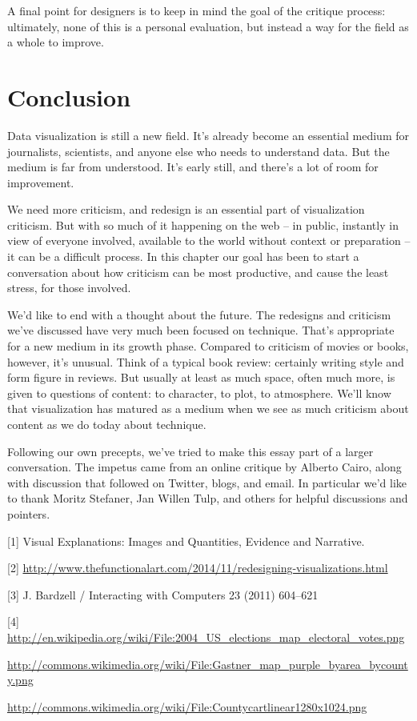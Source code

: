 \documentclass[sigconf,nonacm,screen,pbalance]{acmart}
\begin{document}
A final point for designers is to keep in mind the goal of
the critique process: ultimately, none of this is a personal evaluation, but instead a way
for the field as a whole to improve.

\section{Conclusion}
Data visualization is still a new field. It's already become
an essential medium for journalists, scientists, and anyone else who needs to understand
data. But the medium is far from understood. It's early still, and there's a lot of room
for improvement.

We need more criticism, and redesign is an essential part of
visualization criticism. But with so much of it happening on the web -- in public,
instantly in view of everyone involved, available to the world without context or
preparation -- it can be a difficult process. In this chapter our goal has been to start a
conversation about how criticism can be most productive, and cause the least stress, for
those involved.

We'd like to end with a thought about the future. The
redesigns and criticism we've discussed have very much been focused on technique. That's
appropriate for a new medium in its growth phase. Compared to criticism of movies or
books, however, it's unusual. Think of a typical book review: certainly writing style and
form figure in reviews. But usually at least as much space, often much more, is given to
questions of content: to character, to plot, to atmosphere. We'll know that visualization
has matured as a medium when we see as much criticism about content as we do today about
technique.

\begin{acks}
Following our own precepts, we've tried to make this essay
part of a larger conversation. The impetus came from an online critique by Alberto Cairo,
along with discussion that followed on Twitter, blogs, and email. In particular we'd like
to thank Moritz Stefaner, Jan Willen Tulp, and others for helpful discussions and
pointers.
\end{acks}




[1] Visual Explanations: Images and Quantities, Evidence and Narrative.

[2] \url{http://www.thefunctionalart.com/2014/11/redesigning-visualizations.html}

[3] J. Bardzell / Interacting with Computers 23 (2011) 604–621

[4] \url{http://en.wikipedia.org/wiki/File:2004_US_elections_map_electoral_votes.png}

\url{http://commons.wikimedia.org/wiki/File:Gastner_map_purple_byarea_bycounty.png}

\url{http://commons.wikimedia.org/wiki/File:Countycartlinear1280x1024.png}
\end{document}
